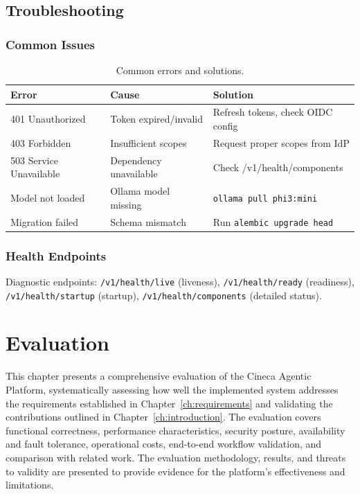 \documentclass[a4paper,twoside]{sapthesis}
\begin{document}
\section{Troubleshooting}
\label{sec:troubleshooting}

\subsection{Common Issues}

\begin{table}[ht]
\centering
\caption{Common errors and solutions.}
\label{tab:common-errors}
\small
\begin{tabularx}{\textwidth}{lXX}
\hline
\textbf{Error} & \textbf{Cause} & \textbf{Solution} \\
\midrule
401 Unauthorized & Token expired/invalid & Refresh tokens, check OIDC config \\
403 Forbidden & Insufficient scopes & Request proper scopes from IdP \\
503 Service Unavailable & Dependency unavailable & Check /v1/health/components \\
Model not loaded & Ollama model missing & \texttt{ollama pull phi3:mini} \\
Migration failed & Schema mismatch & Run \texttt{alembic upgrade head} \\
\midrule
\end{tabularx}
\end{table}

\subsection{Health Endpoints}

Diagnostic endpoints: \texttt{/v1/health/live} (liveness), \texttt{/v1/health/ready} (readiness), \texttt{/v1/health/startup} (startup), \texttt{/v1/health/components} (detailed status).


\chapter{Evaluation}
\label{ch:evaluation}

This chapter presents a comprehensive evaluation of the Cineca Agentic Platform, systematically assessing how well the implemented system addresses the requirements established in Chapter~\ref{ch:requirements} and validating the contributions outlined in Chapter~\ref{ch:introduction}. The evaluation covers functional correctness, performance characteristics, security posture, availability and fault tolerance, operational costs, end-to-end workflow validation, and comparison with related work. The evaluation methodology, results, and threats to validity are presented to provide evidence for the platform's effectiveness and limitations.
\end{document}
